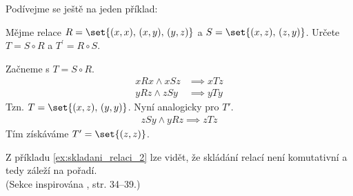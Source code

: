 Podívejme se ještě na jeden příklad:
\begin{example}\label{ex:skladani_relaci_2}
    Mějme relace $R=\set{(x,x),\,(x,y),\,(y,z)}$ a $S=\set{(x,z),\,(z,y)}$. Určete $T=S\circ R$ a $T^\prime=R\circ S$.
\end{example}
\begin{solution}
    Začneme s $T=S\circ R$.
    \begin{align*}
        xRx \land xSz &\implies xTz\\
        yRz \land zSy &\implies yTy
    \end{align*}
    Tzn. $T=\set{(x,z),\,(y,y)}$. Nyní analogicky pro $T\prime$.
    \begin{align*}
        zSy \land yRz \implies zTz
    \end{align*}
    Tím získáváme $T^\prime=\set{(z,z)}$.
\end{solution}
Z příkladu \ref{ex:skladani_relaci_2} lze vidět, že skládání relací není komutativní a tedy záleží na pořadí.\\
(Sekce inspirována \cite{MatousekNesetril2009}, str. 34--39.)

